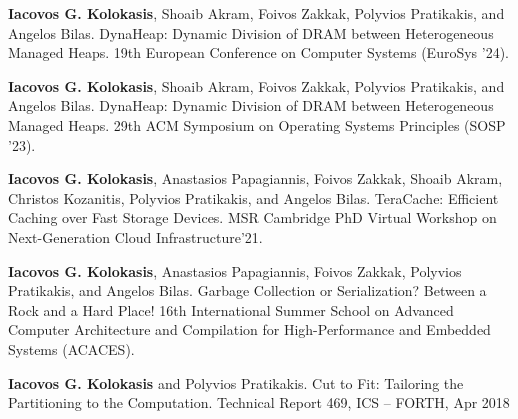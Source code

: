 
\vspace{-15pt}
\begin{cventries}
  \cventry
    {}
    {}
    {}
    {}
    {\textbf{Iacovos G. Kolokasis}, Shoaib Akram, Foivos
    Zakkak, Polyvios Pratikakis, and Angelos Bilas.%
	DynaHeap: Dynamic Division of DRAM between Heterogeneous Managed Heaps.
  19th European Conference on Computer Systems (EuroSys '24).
	}
  {}

  \cventry
    {}
    {}
    {}
    {}
    {\textbf{Iacovos G. Kolokasis}, Shoaib Akram, Foivos
    Zakkak, Polyvios Pratikakis, and Angelos Bilas.%
	DynaHeap: Dynamic Division of DRAM between Heterogeneous Managed Heaps.
  29th ACM Symposium on Operating Systems Principles (SOSP '23).
	}
  {}

  \cventry
    {}
    {}
    {}
    {}
    {\textbf{Iacovos G. Kolokasis}, Anastasios Papagiannis, Foivos
    Zakkak, Shoaib Akram, Christos Kozanitis, Polyvios Pratikakis, and Angelos Bilas.%
	TeraCache: Efficient Caching over Fast Storage Devices. 
	MSR Cambridge PhD Virtual Workshop on Next-Generation Cloud Infrastructure'21.
	}
  {}

  \cventry
    {}
    {}
    {}
    {}
    {\textbf{Iacovos G. Kolokasis}, Anastasios Papagiannis, Foivos
    Zakkak, Polyvios Pratikakis, and Angelos Bilas.%
	Garbage
    Collection or Serialization? Between a Rock and a Hard Place! 
    16th International Summer School on Advanced Computer Architecture
    and Compilation for High-Performance and Embedded Systems
    (ACACES).}
  {}

\end{cventries}
      

\vspace{-15pt}
\begin{cventries}

  \cventry
    {}
    {}
    {}
    {}
    {\textbf{Iacovos G. Kolokasis} and Polyvios Pratikakis.
      Cut to Fit: Tailoring the Partitioning to the Computation.
      Technical Report 469, ICS -- FORTH, Apr 2018 }{}%


\end{cventries}
